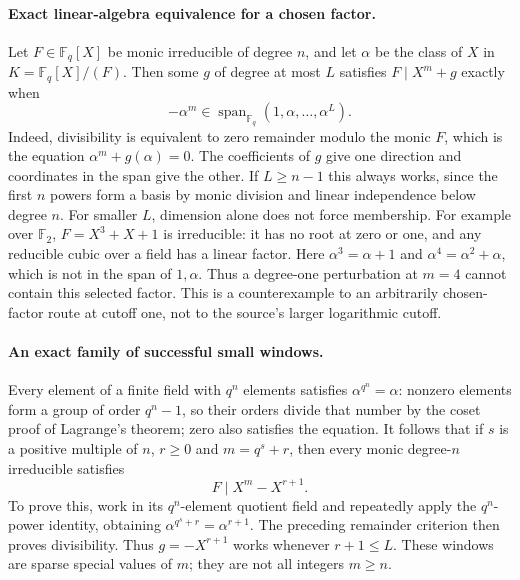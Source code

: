 \documentclass[11pt]{article}
\begin{document}
\paragraph{Exact linear-algebra equivalence for a chosen factor.}
Let $F\in\mathbb F_q[X]$ be monic irreducible of degree $n$, and let
$\alpha$ be the class of $X$ in $K=\mathbb F_q[X]/(F)$.
Then some $g$ of degree at most $L$ satisfies $F\mid X^m+g$ exactly
when
\[
-\alpha^m\in\operatorname{span}_{\mathbb F_q}
                  (1,\alpha,\ldots,\alpha^L).
\]
Indeed, divisibility is equivalent to zero remainder modulo the monic
$F$, which is the equation $\alpha^m+g(\alpha)=0$. The coefficients
of $g$ give one direction and coordinates in the span give the other.
If $L\ge n-1$ this always works, since the first $n$ powers form a
basis by monic division and linear independence below degree $n$.
For smaller $L$, dimension alone does not force membership.
For example over $\mathbb F_2$, $F=X^3+X+1$ is irreducible: it has
no root at zero or one, and any reducible cubic over a field has a
linear factor. Here $\alpha^3=\alpha+1$ and
$\alpha^4=\alpha^2+\alpha$, which is not in the span of $1,\alpha$.
Thus a degree-one perturbation at $m=4$ cannot contain this selected
factor. This is a counterexample to an arbitrarily chosen-factor route
at cutoff one, not to the source's larger logarithmic cutoff.

\paragraph{An exact family of successful small windows.}
Every element of a finite field with $q^n$ elements satisfies
$\alpha^{q^n}=\alpha$: nonzero elements form a group of order
$q^n-1$, so their orders divide that number by the coset proof of
Lagrange's theorem; zero also satisfies the equation.
It follows that if $s$ is a positive multiple of $n$, $r\ge0$ and
$m=q^s+r$, then every monic degree-$n$ irreducible satisfies
\[
F\mid X^m-X^{r+1}.
\]
To prove this, work in its $q^n$-element quotient field and repeatedly
apply the $q^n$-power identity, obtaining
$\alpha^{q^s+r}=\alpha^{r+1}$. The preceding remainder criterion
then proves divisibility. Thus $g=-X^{r+1}$ works whenever $r+1\le L$.
These windows are sparse special values of $m$; they are not all
integers $m\ge n$.
\end{document}
